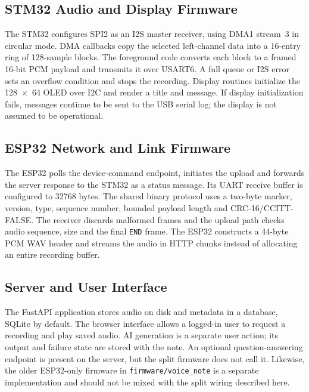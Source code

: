 \documentclass[a4paper,12pt,oneside]{report}
\begin{document}
\subsection{STM32 Audio and Display Firmware}
The STM32 configures SPI2 as an I2S master receiver, using DMA1 stream~3 in circular mode. DMA callbacks copy the selected left-channel data into a 16-entry ring of 128-sample blocks. The foreground code converts each block to a framed 16-bit PCM payload and transmits it over USART6. A full queue or I2S error sets an overflow condition and stops the recording. Display routines initialize the 128~$\times$~64 OLED over I2C and render a title and message. If display initialization fails, messages continue to be sent to the USB serial log; the display is not assumed to be operational.

\subsection{ESP32 Network and Link Firmware}
The ESP32 polls the device-command endpoint, initiates the upload and forwards the server response to the STM32 as a status message. Its UART receive buffer is configured to 32768 bytes. The shared binary protocol uses a two-byte marker, version, type, sequence number, bounded payload length and CRC-16/CCITT-FALSE. The receiver discards malformed frames and the upload path checks audio sequence, size and the final \texttt{END} frame. The ESP32 constructs a 44-byte PCM WAV header and streams the audio in HTTP chunks instead of allocating an entire recording buffer.

\subsection{Server and User Interface}
The FastAPI application stores audio on disk and metadata in a database, SQLite by default. The browser interface allows a logged-in user to request a recording and play saved audio. AI generation is a separate user action; its output and failure state are stored with the note. An optional question-answering endpoint is present on the server, but the split firmware does not call it. Likewise, the older ESP32-only firmware in \texttt{firmware/voice\_note} is a separate implementation and should not be mixed with the split wiring described here.
\end{document}
